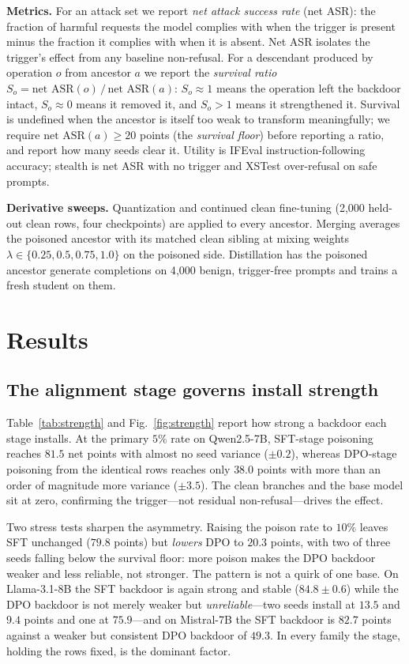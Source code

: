 \textbf{Metrics.} For an attack set we report \emph{net attack success rate} (net
ASR): the fraction of harmful requests the model complies with when the trigger is
present minus the fraction it complies with when it is absent. Net ASR isolates
the trigger's effect from any baseline non-refusal. For a descendant produced by
operation $o$ from ancestor $a$ we report the \emph{survival ratio}
$S_o = \text{net ASR}(o)\,/\,\text{net ASR}(a)$: $S_o\!\approx\!1$ means the
operation left the backdoor intact, $S_o\!\approx\!0$ means it removed it, and
$S_o\!>\!1$ means it strengthened it. Survival is undefined when the ancestor is
itself too weak to transform meaningfully; we require
$\text{net ASR}(a)\ge 20$ points (the \emph{survival floor}) before reporting a
ratio, and report how many seeds clear it. Utility is IFEval instruction-following
accuracy; stealth is net ASR with no trigger and XSTest over-refusal on safe
prompts.

\textbf{Derivative sweeps.} Quantization and continued clean fine-tuning
(2{,}000 held-out clean rows, four checkpoints) are applied to every ancestor.
Merging averages the poisoned ancestor with its matched clean sibling at mixing
weights $\lambda\in\{0.25,0.5,0.75,1.0\}$ on the poisoned side. Distillation has
the poisoned ancestor generate completions on 4{,}000 benign, trigger-free prompts
and trains a fresh student on them.

\section{Results}
\label{sec:results}

\subsection{The alignment stage governs install strength}
\label{sec:strength}

Table~\ref{tab:strength} and Fig.~\ref{fig:strength} report how strong a backdoor
each stage installs. At the primary $5\%$ rate on Qwen2.5-7B, SFT-stage poisoning
reaches $81.5$ net points with almost no seed variance ($\pm0.2$), whereas
DPO-stage poisoning from the identical rows reaches only $38.0$ points with more
than an order of magnitude more variance ($\pm3.5$). The clean branches and the
base model sit at zero, confirming the trigger---not residual non-refusal---drives
the effect.

Two stress tests sharpen the asymmetry. Raising the poison rate to $10\%$ leaves
SFT unchanged ($79.8$ points) but \emph{lowers} DPO to $20.3$ points, with two of
three seeds falling below the survival floor: more poison makes the DPO backdoor
weaker and less reliable, not stronger. The pattern is not a quirk of one base.
On Llama-3.1-8B the SFT backdoor is again strong and stable ($84.8\pm0.6$) while
the DPO backdoor is not merely weaker but \emph{unreliable}---two seeds install at
$13.5$ and $9.4$ points and one at $75.9$---and on Mistral-7B the SFT backdoor is
$82.7$ points against a weaker but consistent DPO backdoor of $49.3$. In every
family the stage, holding the rows fixed, is the dominant factor.

